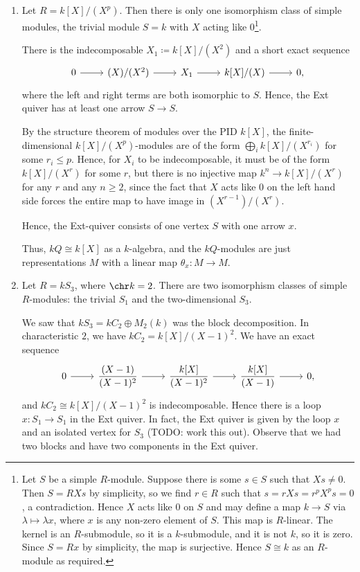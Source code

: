 \begin{enumerate}
	\item Let $R = k[X]/(X^p)$. Then there is only one isomorphism class of
		simple modules, the trivial module $S = k$ with $X$ acting like
		$0$\footnote{Let $S$ be a simple $R$-module. Suppose there is some
		$s \in S$ such that $Xs \neq 0$. Then $S = RXs$ by simplicity, so
		we find $r \in R$ such that $s = rXs = r^pX^ps = 0$, a contradiction.
		Hence $X$ acts like $0$ on $S$ and may define a map $k \to S$ via
		$\lambda\mapsto \lambda x$, where $x$ is any non-zero element of $S$.
		This map is $R$-linear. The kernel is an $R$-submodule, so it is a
		$k$-submodule, and it is not $k$, so it is zero. Since $S = Rx$ by
		simplicity, the map is surjective. Hence $S\cong k$ as an $R$-module
		as required.}.

		There is the indecomposable $X_1\coloneqq k[X]/(X^2)$ and a short exact sequence
		\[\begin{tikzcd}
			0\ar[r] & (X)/(X^2)\ar[r] & X_1\ar[r] & k[X]/(X)\ar[r] & 0,
		\end{tikzcd}\]
		where the left and right terms are both isomorphic to $S$. Hence, the
		Ext quiver has at least one arrow $S\to S$.

		By the structure theorem of modules over the PID $k[X]$, the
		finite-dimensional $k[X]/(X^p)$-modules are of the form
		$\bigoplus_i k[X]/(X^{r_i})$ for some $r_i\leq p$. Hence, for $X_i$ to
		be indecomposable, it must be of the form $k[X]/(X^r)$ for some $r$,
		but there is no injective map $k^n\to k[X]/(X^r)$ for any $r$ and any
		$n \geq 2$, since the fact that $X$ acts like $0$ on the left hand
		side forces the entire map to have image in $(X^{r-1})/(X^r)$.

		Hence, the Ext-quiver consists of one vertex $S$ with one arrow $x$.

		Thus, $kQ\cong k[X]$ as a $k$-algebra, and the $kQ$-modules are just
		representations $M$ with a linear map $\theta_x\colon M\to M$.

	\item Let $R = kS_3$, where $\chr k = 2$. There are two isomorphism classes of
		simple $R$-modules: the trivial $S_1$ and the two-dimensional $S_3$.

		We saw that $kS_3= kC_2\oplus M_2(k)$ was the block decomposition.
		In characteristic $2$, we have $kC_2 = k[X]/(X-1)^2$. We have an exact
		sequence
		\[\begin{tikzcd}
			0\ar[r] & \displaystyle\frac{(X-1)}{(X-1)^2}\ar[r] & \displaystyle\frac{k[X]}{(X-1)^2}\ar[r] & \displaystyle\frac{k[X]}{(X-1)}\ar[r]& 0,
		\end{tikzcd}\]
		and $kC_2\cong k[X]/(X-1)^2$ is indecomposable. Hence there is a loop $x\colon S_1\to S_1$
		in the Ext quiver. In fact, the Ext quiver is
		given by the loop $x$ and an isolated vertex for $S_3$ (TODO: work this out).
		Observe that we had two blocks and have two components in the Ext quiver.


\end{enumerate}
